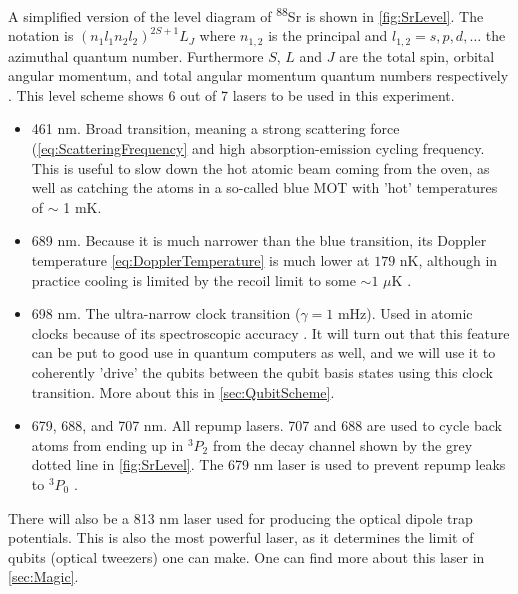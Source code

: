 A simplified version of the level diagram of \textsuperscript{88}Sr is shown in \cref{fig:SrLevel}. 
The notation is $(n_1l_1 n_2l_2)^{2S+1}L_J$ where $n_{1,2}$ is the principal and $l_{1,2} = s, p, d, \ldots$ the azimuthal quantum number. 
Furthermore $S$, $L$ and $J$ are the total spin, orbital angular momentum, and total angular momentum quantum numbers respectively \cite{Cowan1981}. 
This level scheme shows 6 out of 7 lasers to be used in this experiment. 

\begin{itemize}
	\item 461 nm. Broad transition, meaning a strong scattering force (\cref{eq:ScatteringFrequency} and high absorption-emission cycling frequency.
	This is useful to slow down the hot atomic beam coming from the oven, as well as catching the atoms in a so-called blue \ac{MOT} with 'hot' temperatures of $\sim$ 1 mK.
	
	\item 689 nm. Because it is much narrower than the blue transition, its Doppler temperature \cref{eq:DopplerTemperature} is much lower at $179$ nK, although in practice cooling is limited by the recoil limit to some $\sim 1$ $\mu$K \cite{Stellmer2013,Boyd2007}.
	
	\item 698 nm. The ultra-narrow clock transition ($\gamma = 1$ mHz). 
	Used in atomic clocks because of its spectroscopic accuracy \cite{Bloom2014}.
	It will turn out that this feature can be put to good use in quantum computers as well, and we will use it to coherently 'drive' the qubits between the qubit basis states using this clock transition. 
	More about this in \cref{sec:QubitScheme}.
	
	\item 679, 688, and 707 nm. 
	All repump lasers. 707 and 688 are used to cycle back atoms from ending up in ${}^3P_2$ from the decay channel shown by the grey dotted line in \cref{fig:SrLevel}. The 679 nm laser is used to prevent repump leaks to ${}^3P_0$ \cite{Stellmer2013,Xu2003}.
\end{itemize}

There will also be a 813 nm laser used for producing the optical dipole trap potentials.
This is also the most powerful laser, as it determines the limit of qubits (optical tweezers) one can make. 
One can find more about this laser in \cref{sec:Magic}.

